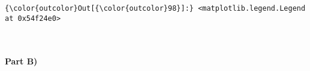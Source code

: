 \documentclass[11pt]{article}
\begin{document}
\begin{Verbatim}[commandchars=\\\{\}]
{\color{outcolor}Out[{\color{outcolor}98}]:} <matplotlib.legend.Legend at 0x54f24e0>
\end{Verbatim}
            
    \begin{center}
    \end{center}
    { \hspace*{\fill} \\}
    
    \paragraph{Part B)}\label{part-b}
\end{document}
